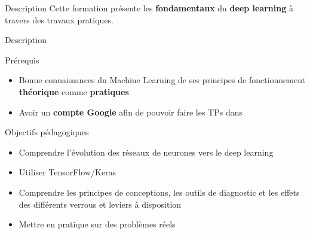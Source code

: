
\begin{frame}{Description}
  Cette formation présente les \textbf{fondamentaux} du \textbf{deep learning} à travers des travaux pratiques.
\end{frame}

\begin{frame}{Description}
\end{frame}

\begin{frame}{Prérequis}
  \begin{itemize}
  \item Bonne connaissances du Machine Learning de ses principes de fonctionnement \textbf{théorique} comme \textbf{pratiques}
  \item Avoir un \textbf{compte Google} afin de pouvoir faire les TPs dans 
  \end{itemize}
\end{frame}

\begin{frame}{Objectifs pédagogiques}
  \begin{itemize}
  \item Comprendre l'évolution des réseaux de neurones vers le deep learning
  \item Utiliser TensorFlow/Keras
  \item Comprendre les principes de conceptions, les outils de diagnostic et les effets des différents verrous et leviers à disposition
  \item Mettre en pratique sur des problèmes réels
  \end{itemize}
\end{frame}
